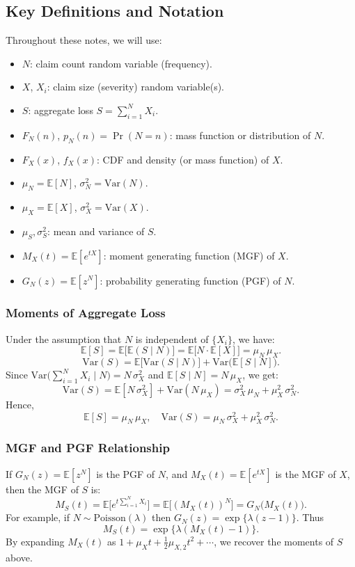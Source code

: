 \documentclass[11pt]{article}
\begin{document}
\subsection{Key Definitions and Notation}
\noindent Throughout these notes, we will use:
\begin{itemize}
  \item \(N\): claim count random variable (frequency).
  \item \(X\), \(X_i\): claim size (severity) random variable(s).
  \item \(S\): aggregate loss \(S=\sum_{i=1}^N X_i\).
  \item \(F_N(n)\), \(p_N(n) = \Pr(N=n)\): mass function or distribution of \(N\).
  \item \(F_X(x)\), \(f_X(x)\): CDF and density (or mass function) of \(X\).
  \item \(\mu_N = \mathbb{E}[N]\), \(\sigma_N^2 = \mathrm{Var}(N)\).
  \item \(\mu_X = \mathbb{E}[X]\), \(\sigma_X^2 = \mathrm{Var}(X)\).
  \item \(\mu_S, \sigma_S^2\): mean and variance of \(S\).
  \item \(M_X(t) = \mathbb{E}[e^{tX}]\): moment generating function (MGF) of \(X\).
  \item \(G_N(z) = \mathbb{E}[z^N]\): probability generating function (PGF) of \(N\).
\end{itemize}

\subsubsection{Moments of Aggregate Loss}
\noindent Under the assumption that \(N\) is independent of \(\{X_i\}\), we have:
\[
\mathbb{E}[S]
= \mathbb{E}\big[\mathbb{E}(S \mid N)\big]
= \mathbb{E}\big[N \cdot \mathbb{E}[X]\big]
= \mu_N \, \mu_X.
\]
\[
\mathrm{Var}(S)
= \mathbb{E}\big[\mathrm{Var}(S \mid N)\big]
+ \mathrm{Var}\big(\mathbb{E}[S \mid N]\big).
\]
\noindent Since \(\mathrm{Var}\big(\sum_{i=1}^N X_i \mid N\big) = N\,\sigma_X^2\) and \(\mathbb{E}[S \mid N] = N\,\mu_X\), we get:
\[
\mathrm{Var}(S)
= \mathbb{E}[N\,\sigma_X^2] + \mathrm{Var}(N\,\mu_X)
= \sigma_X^2\,\mu_N + \mu_X^2\,\sigma_N^2.
\]
\noindent Hence,
\[
\boxed{
\mathbb{E}[S] = \mu_N \,\mu_X, 
\quad
\mathrm{Var}(S) = \mu_N\,\sigma_X^2 + \mu_X^2\,\sigma_N^2.
}
\]

\subsubsection{MGF and PGF Relationship}
\noindent If \(G_N(z) = \mathbb{E}[z^N]\) is the PGF of \(N\), and \(M_X(t) = \mathbb{E}[e^{tX}]\) is the MGF of \(X\), then the MGF of \(S\) is:
\[
M_S(t)
= \mathbb{E}\big[e^{t \sum_{i=1}^N X_i}\big]
= \mathbb{E}\big[(M_X(t))^N\big]
= G_N\big(M_X(t)\big).
\]
\noindent For example, if \(N\sim \text{Poisson}(\lambda)\) then \(G_N(z)=\exp\big\{\lambda(z-1)\big\}\). Thus
\[
M_S(t) = \exp\big\{\lambda (M_X(t) - 1)\big\}.
\]
\noindent By expanding \(M_X(t)\) as \(1 + \mu_X t + \tfrac{1}{2}\mu_{X,2} t^2 + \cdots\), we recover the moments of \(S\) above.
\end{document}
